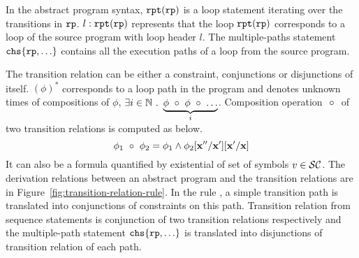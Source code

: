 In the abstract program syntax, $\mathtt{rpt}(\mathtt{rp})$ is a loop statement iterating over the transitions in $\mathtt{rp}$.
$l: \mathtt{rpt}(\mathtt{rp})$ represents that the loop $ \mathtt{rpt}(\mathtt{rp})$
corresponds to a loop of the source program with loop header $l$.
The multiple-paths statement $\rpchoose{\rprog, \ldots} $ contains all the execution paths of a loop from the source program.

The transition relation can be either a constraint, conjunctions or disjunctions of itself.
$(\phi)^*$ corresponds to a loop path in the program and denotes unknown times of compositions of
$\phi$, $\exists i \in \mathbb{N} ~.~ \underbrace{\phi ~\circ~ \phi ~\circ~ \ldots}_{i} $.
Composition operation $~\circ~$ of two transition relations is computed as below.
\[
  \phi_1 ~\circ~ \phi_2 = \phi_1 \land \phi_2[\bf{}{x''}/\bf{}{x'}][\bf{}{x'}/{\bf{}{x}}]
\]
It can also be a formula quantified by existential of set of symbols $v \in \mathcal{SC}$.
The derivation relations between an abstract program and the transition relations are in Figure~\ref{fig:transition-relation-rule}.
In the rule , a simple transition path is translated into conjunctions of constraints on this path.
Transition relation from sequence statements is conjunction of two transition relations respectively and the multiple-path statement $\rpchoose{\rprog, \ldots} $ is translated into disjunctions of 
transition relation of each path.

